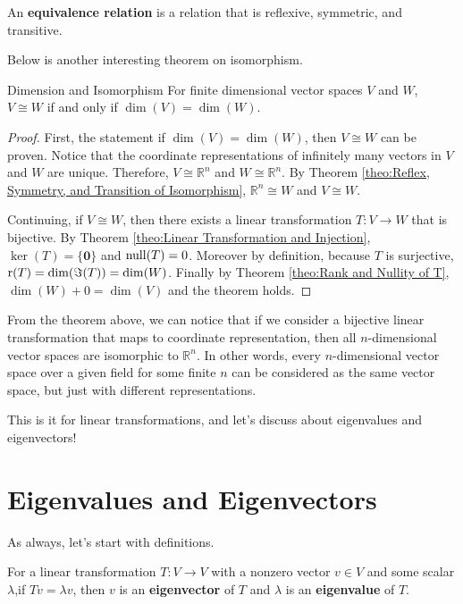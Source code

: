 \documentclass[../main.tex]{subfiles}
\begin{document}
\begin{definition}
An \textbf{equivalence relation} is a relation that is reflexive,
symmetric, and transitive.
\end{definition}

Below is another interesting theorem on isomorphism.

\begin{theorem}{Dimension and Isomorphism}
For finite dimensional vector spaces $V$ and $W$, $V \cong W$ if and
only if $\dim(V) = \dim(W)$.
\end{theorem}
\begin{proof}
First, the statement if $\dim(V) = \dim(W)$, then $V \cong W$ can be
proven. Notice that the coordinate representations of infinitely many
vectors in $V$ and $W$ are unique. Therefore, $V \cong \mathbb{R}^n$
and $W \cong \mathbb{R}^n$. By Theorem \ref{theo:Reflex, Symmetry, and
Transition of Isomorphism}, $\mathbb{R}^n \cong W$ and $V \cong W$.

Continuing, if $V \cong W$, then there exists a linear transformation
$T: V \to W$ that is bijective. By Theorem \ref{theo:Linear
Transformation and Injection}, $\ker(T) = \{ \mathbf{0} \}$ and
$\operatorname{null}(T) = 0$. Moreover by definition, because $T$ is surjective,
$\operatorname{r}(T) = \dim(\Im(T)) = \dim(W)$. Finally by Theorem \ref{theo:Rank
and Nullity of T}, $\dim(W) + 0 = \dim(V)$ and the theorem holds.
\end{proof}

From the theorem above, we can notice that if we consider a bijective
linear transformation that maps to coordinate representation, then
all $n$-dimensional vector spaces are isomorphic to $\mathbb{R}^n$.
In other words, every $n$-dimensional vector space over a given
field for some finite $n$ can be considered as the same vector space,
but just with different representations.

This is it for linear transformations, and let's discuss about
eigenvalues and eigenvectors!

\section{Eigenvalues and Eigenvectors}

As always, let's start with definitions.

\begin{definition}
For a linear transformation $T: V \to V$ with a nonzero vector
$v \in V$ and some scalar $\lambda$,if $Tv = \lambda v$, then
$v$ is an \textbf{eigenvector} of $T$ and $\lambda$ is an
\textbf{eigenvalue} of $T$.
\end{definition}
\end{document}
